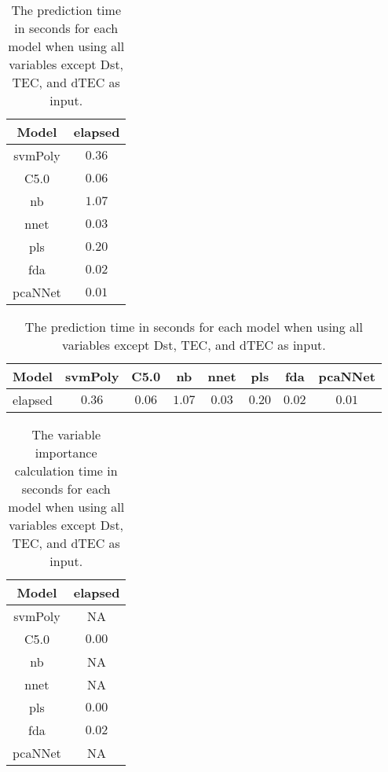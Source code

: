 \begin{table}[!ht]
	\centering
	\begin{tabular}{|c|c|}
		\hline
		Model & elapsed \\ \hline
		svmPoly & $0.36$ \\ \hline
		C5.0 & $0.06$ \\ \hline
		nb & $1.07$ \\ \hline
		nnet & $0.03$ \\ \hline
		pls & $0.20$ \\ \hline
		fda & $0.02$ \\ \hline
		pcaNNet & $0.01$ \\ \hline
	\end{tabular}
	\caption{The prediction time in seconds for each model when using all variables except Dst, TEC, and dTEC as input.}
	\label{tab:time:noTEC:predict}
\end{table}

\begin{table}[!ht]
	\centering
	\begin{tabular}{|c|c|c|c|c|c|c|c|}
		\hline
		Model & svmPoly & C5.0 & nb & nnet & pls & fda & pcaNNet \\ \hline
		elapsed & $0.36$ & $0.06$ & $1.07$ & $0.03$ & $0.20$ & $0.02$ & $0.01$ \\ \hline
	\end{tabular}
	\caption{The prediction time in seconds for each model when using all variables except Dst, TEC, and dTEC as input.}
	\label{tab:time:reverse:noTEC:predict}
\end{table}

\begin{table}[!ht]
	\centering
	\begin{tabular}{|c|c|}
		\hline
		Model & elapsed \\ \hline
		svmPoly & NA \\ \hline
		C5.0 & $0.00$ \\ \hline
		nb & NA \\ \hline
		nnet & NA \\ \hline
		pls & $0.00$ \\ \hline
		fda & $0.02$ \\ \hline
		pcaNNet & NA \\ \hline
	\end{tabular}
	\caption{The variable importance calculation time in seconds for each model when using all variables except Dst, TEC, and dTEC as input.}
	\label{tab:time:noTEC:importance}
\end{table}

